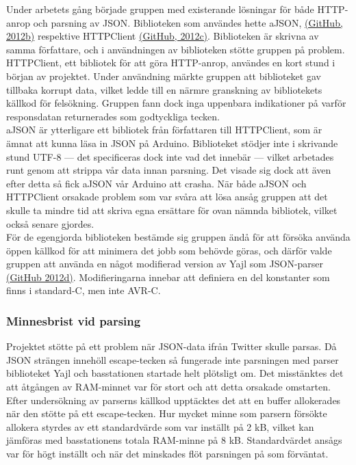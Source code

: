 \documentclass[a4paper,11pt]{article}
\begin{document}
Under arbetets gång började gruppen med existerande lösningar för både HTTP-anrop och parsning av JSON. Biblioteken som användes hette aJSON, \hyperref[github]{(GitHub, 2012b)} respektive HTTPClient \hyperref[github]{(GitHub, 2012c)}. Biblioteken är skrivna av samma författare, och i användningen av biblioteken stötte gruppen på problem.\\

HTTPClient, ett bibliotek för att göra HTTP-anrop, användes en kort stund i början av projektet. Under användning märkte gruppen att biblioteket gav tillbaka korrupt data, vilket ledde till en närmre granskning av bibliotekets källkod för felsökning. Gruppen fann dock inga uppenbara indikationer på varför responsdatan returnerades som godtyckliga tecken.\\

aJSON är ytterligare ett bibliotek från författaren till HTTPClient, som är ämnat att kunna läsa in JSON på Arduino. Biblioteket stödjer inte i skrivande stund UTF-8 — det specificeras dock inte vad det innebär — vilket arbetades runt genom att strippa vår data innan parsning. Det visade sig dock att även efter detta så fick aJSON vår Arduino att crasha. När både aJSON och HTTPClient orsakade problem som var svåra att lösa ansåg gruppen att det skulle ta mindre tid att skriva egna ersättare för ovan nämnda bibliotek, vilket också senare gjordes.\\

För de egengjorda biblioteken bestämde sig gruppen ändå för att försöka använda öppen källkod för att minimera det jobb som behövde göras, och därför valde gruppen att använda en något modifierad version av Yajl som JSON-parser \hyperref[github]{(GitHub 2012d)}. Modifieringarna innebar att definiera en del konstanter som finns i standard-C, men inte AVR-C.

\subsubsection{Minnesbrist vid parsing}
Projektet stötte på ett problem när JSON-data ifrån Twitter skulle parsas. Då JSON strängen innehöll escape-tecken så fungerade inte parsningen med parser biblioteket Yajl och basstationen startade helt plötsligt om. Det misstänktes det att åtgången av RAM-minnet var för stort och att detta orsakade omstarten. Efter undersökning av parserns källkod upptäcktes det att en buffer allokerades när den stötte på ett escape-tecken. Hur mycket minne som parsern försökte allokera styrdes av ett standardvärde som var inställt på 2 kB, vilket kan jämföras med basstationens totala RAM-minne på 8 kB. Standardvärdet ansågs var för högt inställt och när det minskades flöt parsningen på som förväntat.
\end{document}
